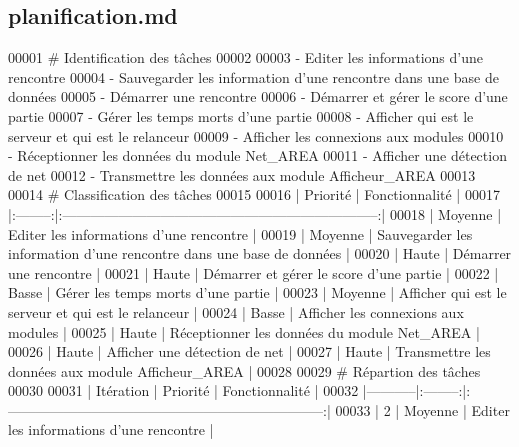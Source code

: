 \hypertarget{planification_8md_source}{}\subsection{planification.\+md}

\begin{DoxyCode}
00001 # Identification des tâches
00002 
00003 - Editer les informations d'une rencontre                              
00004 - Sauvegarder les information d'une rencontre dans une base de données 
00005 - Démarrer une rencontre                                               
00006 - Démarrer et gérer le score d'une partie                              
00007 - Gérer les temps morts d'une partie                                   
00008 - Afficher qui est le serveur et qui est le relanceur                  
00009 - Afficher les connexions aux modules                                  
00010 - Réceptionner les données du module Net\_AREA                          
00011 - Afficher une détection de net                                        
00012 - Transmettre les données aux module Afficheur\_AREA 
00013 
00014 # Classification des tâches
00015 
00016 | Priorité |                            Fonctionnalité                            |
00017 |:--------:|:--------------------------------------------------------------------:|
00018 |  Moyenne | Editer les informations d'une rencontre                              |
00019 |  Moyenne | Sauvegarder les information d'une rencontre dans une base de données |
00020 |   Haute  | Démarrer une rencontre                                               |
00021 |   Haute  | Démarrer et gérer le score d'une partie                              |
00022 |   Basse  | Gérer les temps morts d'une partie                                   |
00023 |  Moyenne | Afficher qui est le serveur et qui est le relanceur                  |
00024 |   Basse  | Afficher les connexions aux modules                                  |
00025 |   Haute  | Réceptionner les données du module Net\_AREA                          |
00026 |   Haute  | Afficher une détection de net                                        |
00027 |   Haute  | Transmettre les données aux module Afficheur\_AREA                    |
00028 
00029 # Répartion des tâches
00030 
00031 | Itération | Priorité |                            Fonctionnalité                            |
00032 |-----------|:--------:|:--------------------------------------------------------------------:|
00033 |     2     |  Moyenne | Editer les informations d'une rencontre                              |

\end{DoxyCode}
